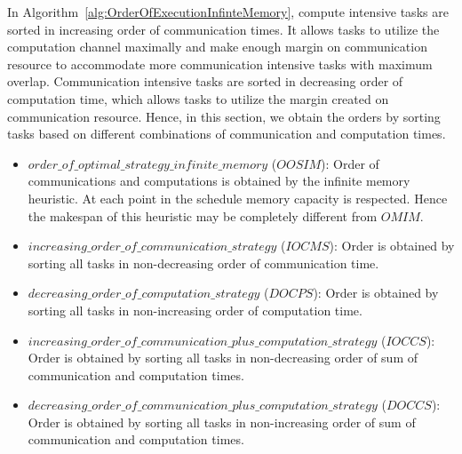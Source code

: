 \documentclass[sigconf]{acmart}
\begin{document}
In Algorithm~\ref{alg:OrderOfExecutionInfinteMemory}, compute intensive tasks  are sorted in increasing order of communication times. It allows tasks to utilize the computation channel maximally and make enough margin on communication resource to accommodate more communication intensive tasks with maximum overlap. Communication intensive tasks are sorted in decreasing order of computation time, which allows tasks to utilize the margin created on communication resource. Hence,  in this section, we obtain the orders by sorting tasks based on different combinations of communication and computation times.

\begin{itemize}[a)]
	\item $order\_of\_optimal\_strategy\_infinite\_memory $ ($OOSIM$): Order of communications and computations is obtained by the infinite memory heuristic. At each point in the schedule memory capacity is respected. Hence the makespan of this heuristic may be completely different from $OMIM$.
	
	\item $increasing\_order\_of\_communication\_strategy$ ($IOCMS$): Order is obtained by sorting all tasks in non-decreasing order of communication time. 
	
	\item $decreasing\_order\_of\_computation\_strategy$ ($DOCPS$): Order is obtained by sorting all tasks in non-increasing order of computation time. 
	\item $increasing\_order\_of\_communication\_plus\_computation\_strategy$ ($IOCCS$): Order is obtained by sorting all tasks in non-decreasing order of sum of communication and computation times.
	\item $decreasing\_order\_of\_communication\_plus\_computation\_strategy$ ($DOCCS$): Order is obtained by sorting all tasks in non-increasing order of sum of communication and computation times.
	
\end{itemize}
\end{document}
